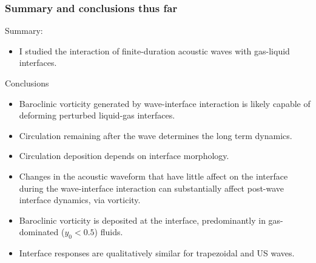 \begin{frame} \frametitle{\vspace*{0.5cm}Summary and conclusions thus far}
  \small
  Summary:
  \begin{itemize}
  \item I studied the interaction of finite-duration acoustic waves with gas-liquid interfaces.
  \end{itemize}

  Conclusions
  \begin{itemize}
  \item Baroclinic vorticity generated by wave-interface interaction is likely capable of deforming perturbed liquid-gas interfaces.\vfill%
  \item Circulation remaining after the wave determines the long term dynamics.
  \item Circulation deposition depends on interface morphology.
  \item Changes in the acoustic waveform that have little affect on
    the interface during the wave-interface interaction can
    substantially affect post-wave interface dynamics, via
    vorticity.\vfill%
  \item Baroclinic vorticity is deposited at the interface, predominantly in gas-dominated ($y_0<0.5$) fluids.\vfill%
  \item Interface responses are qualitatively similar for trapezoidal and US waves.
  \end{itemize}
\end{frame}
